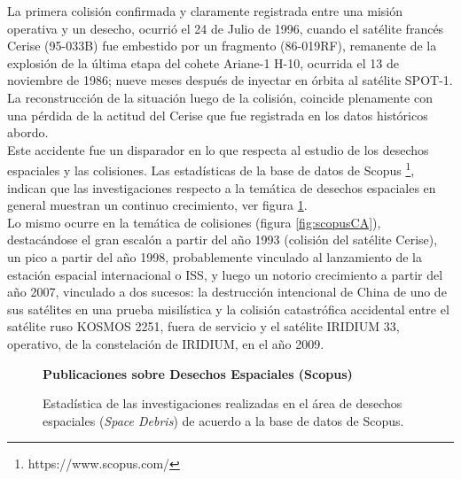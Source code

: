 La primera colisi\'on confirmada y claramente registrada entre una misi\'on operativa y un desecho, ocurri\'o el 24 de Julio de 1996, cuando el sat\'elite franc\'es Cerise (95-033B) fue embestido por un fragmento (86-019RF), remanente de la explosi\'on de la \'ultima etapa del cohete Ariane-1 H-10, ocurrida el 13 de noviembre de 1986; nueve meses despu\'es de inyectar en \'orbita al sat\'elite SPOT-1. La reconstrucci\'on de la situaci\'on luego de la colisi\'on, coincide plenamente con una p\'erdida de la actitud del Cerise que fue registrada en los datos hist\'oricos abordo. \citep{KlinkradChapter8}\\

Este accidente fue un disparador en lo que respecta al estudio de los desechos espaciales y las colisiones. Las estad\'isticas de la base de datos de Scopus \footnote{https://www.scopus.com/}, indican que las investigaciones respecto a la tem\'atica de desechos espaciales en general muestran un continuo crecimiento, ver figura \ref{fig:scopusSD}.\\
Lo mismo ocurre en la tem\'atica de colisiones (figura \ref{fig:scopusCA}), destac\'andose el gran escal\'on a partir del a\~no 1993 (colisi\'on del sat\'elite Cerise), un pico a partir del a\~no 1998, probablemente vinculado al lanzamiento de la estaci\'on espacial internacional o \ac{ISS}, y luego un notorio crecimiento a partir del a\~no 2007, vinculado a dos sucesos: la destrucci\'on intencional de China de uno de sus sat\'elites en una prueba misil\'istica y la colisi\'on catastr\'ofica accidental entre el sat\'elite ruso KOSMOS 2251, fuera de servicio y el sat\'elite IRIDIUM 33, operativo, de la constelaci\'on de IRIDIUM, en el a\~no 2009.\\


\begin{figure}[!h]
\centering
  \textbf{Publicaciones sobre Desechos Espaciales (Scopus)}\par\medskip
    \caption[Desechos Espaciales seg\'un Scopus]{Estad\'istica de las investigaciones realizadas en el \'area de desechos espaciales ({\it{Space Debris}}) de acuerdo a la base de datos de Scopus.}
    \label{fig:scopusSD}
\end{figure}

